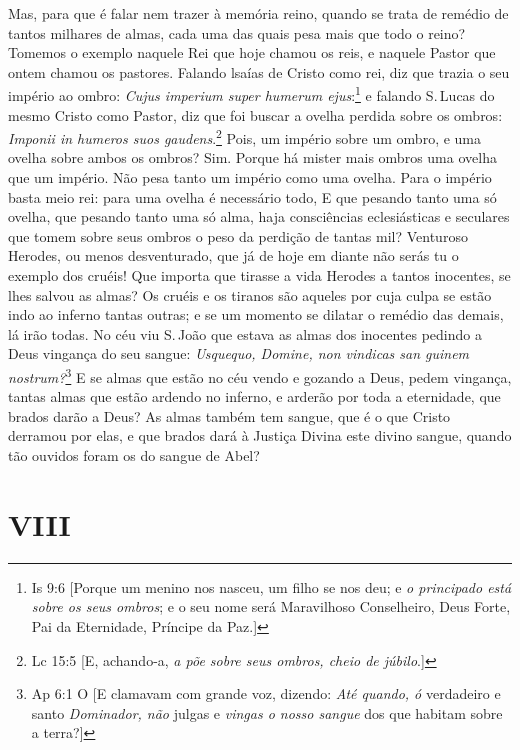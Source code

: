 Mas, para que é falar nem trazer à memória reino, quando se trata de
remédio de tantos milhares de almas, cada uma das quais pesa mais que
todo o reino? Tomemos o exemplo naquele Rei que hoje chamou os reis, e
naquele Pastor que ontem chamou os pastores. Falando lsaías de Cristo
como rei, diz que trazia o seu império ao ombro: \emph{Cujus imperium
super humerum ejus}:\footnote{Is 9:6 [Porque um menino nos nasceu, um filho se nos deu; e \emph{o principado está sobre os seus ombros}; e o seu nome será Maravilhoso Conselheiro, Deus Forte, Pai da Eternidade, Príncipe da Paz.]} e falando S.\,Lucas do mesmo Cristo como Pastor, diz que foi buscar a ovelha perdida sobre os ombros: \emph{Imponii in
humeros suos gaudens}.\footnote{Lc 15:5 [E, achando-a, \emph{a põe sobre seus ombros, cheio de júbilo}.]} Pois, um império sobre um ombro, e uma
ovelha sobre ambos os ombros? Sim. Porque há mister mais ombros uma
ovelha que um império. Não pesa tanto um império como uma ovelha. Para o
império basta meio rei: para uma ovelha é necessário todo, E que pesando
tanto uma só ovelha, que pesando tanto uma só alma, haja consciências
eclesiásticas e seculares que tomem sobre seus ombros o peso da perdição
de tantas mil? Venturoso Herodes, ou menos desventurado, que já de hoje
em diante não serás tu o exemplo dos cruéis! Que importa que tirasse a
vida Herodes a tantos inocentes, se lhes salvou as almas? Os cruéis e os
tiranos são aqueles por cuja culpa se estão indo ao inferno tantas
outras; e se um momento se dilatar o remédio das demais, lá irão todas.
No céu viu S.\,João que estava as almas dos inocentes pedindo a Deus
vingança do seu sangue: \emph{Usquequo, Domine, non vindicas san guinem
nostrum?}\footnote{Ap 6:1 O [E clamavam com grande voz, dizendo: \emph{Até quando, ó} verdadeiro e santo \emph{Dominador, não} julgas e \emph{vingas o nosso sangue} dos que habitam sobre a terra?]} E se almas que estão no céu vendo e gozando a
Deus, pedem vingança, tantas almas que estão ardendo no inferno, e
arderão por toda a eternidade, que brados darão a Deus?
As almas também tem sangue, que é o que Cristo derramou por elas, e que
brados dará à Justiça Divina este divino sangue, quando tão ouvidos
foram os do sangue de Abel?

\section*{VIII}

